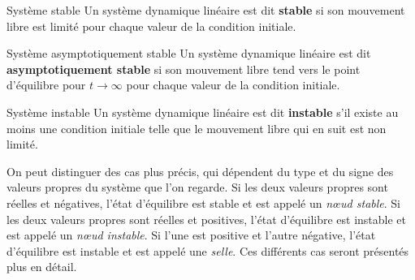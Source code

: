         \begin{definition}{Système stable}\label{def:stabilite}
            Un système dynamique linéaire est dit \textbf{stable} si son mouvement libre est limité pour chaque valeur de la condition initiale.
        \end{definition}

        \begin{definition}{Système asymptotiquement stable}
            Un système dynamique linéaire est dit \textbf{asymptotiquement stable} si son mouvement libre tend vers le point d'équilibre pour $t \to \infty$ pour chaque valeur de la condition initiale.
        \end{definition}

        \begin{definition}{Système instable}
            Un système dynamique linéaire est dit \textbf{instable} s'il existe au moins une condition initiale telle que le mouvement libre qui en suit est non limité.
        \end{definition}

        On peut distinguer des cas plus précis, qui dépendent du type et du signe des valeurs propres du système que l'on regarde. 
        Si les deux valeurs propres sont réelles et négatives, l'état d'équilibre est stable et est appelé un \textit{nœud stable}. Si les deux valeurs propres sont réelles et positives, l'état d'équilibre est instable et est appelé un \textit{nœud instable}. Si l'une est positive et l'autre négative, l'état d'équilibre est instable et est appelé une \textit{selle}. Ces différents cas seront présentés plus en détail.

    
